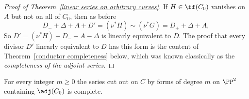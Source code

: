 \begin{proof}[Proof of Theorem~\ref{linear series on arbitrary curves}]
If $H\in \ff(C_{0})$ vanishes on $A$ but not on all of $C_{0}$, then
as before
$$
 D_{-} +\Delta + A+ D' = (\nu^*H) \sim (\nu^*G) = D_{+} + \Delta + A,
$$
So $D' = (\nu^*{H})-D_{-}-A-\Delta$ is linearly equivalent to $D$. The
proof that every
divisor $D'$ linearly equivalent to $D$ has this form is the content of
Theorem~\ref{conductor completeness} below,
which was known classically as the \emph{completeness of the adjoint series}.
%
%
\end{proof}

\begin{theorem}\label{conductor completeness}
For every integer $m\geq 0$ the series cut out on $C$ by forms of
degree $m$
on $\PP^{2}$ containing $\adj(C_{0})$ is complete.
\end{theorem}

